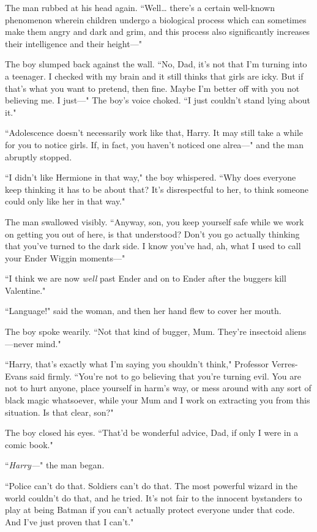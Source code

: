 The man rubbed at his head again. ``Well{\ldots} there's a certain well-known phenomenon wherein children undergo a biological process which can sometimes make them angry and dark and grim, and this process also significantly increases their intelligence and their height—"

The boy slumped back against the wall. ``No, Dad, it's not that I'm turning into a teenager. I checked with my brain and it still thinks that girls are icky. But if that's what you want to pretend, then fine. Maybe I'm better off with you not believing me. I just—" The boy's voice choked. ``I just couldn't stand lying about it."

``Adolescence doesn't necessarily work like that, Harry. It may still take a while for you to notice girls. If, in fact, you haven't noticed one alrea—" and the man abruptly stopped.

``I didn't like Hermione in that way," the boy whispered. ``Why does everyone keep thinking it has to be about that? It's disrespectful to her, to think someone could only like her in that way."

The man swallowed visibly. ``Anyway, son, you keep yourself safe while we work on getting you out of here, is that understood? Don't you go actually thinking that you've turned to the dark side. I know you've had, ah, what I used to call your Ender Wiggin moments—"

``I think we are now \emph{well} past Ender and on to Ender after the buggers kill Valentine."

``Language!" said the woman, and then her hand flew to cover her mouth.

The boy spoke wearily. ``Not that kind of bugger, Mum. They're insectoid aliens—never mind."

``Harry, that's exactly what I'm saying you shouldn't think," Professor Verres-Evans said firmly. ``You're not to go believing that you're turning evil. You are not to hurt anyone, place yourself in harm's way, or mess around with any sort of black magic whatsoever, while your Mum and I work on extracting you from this situation. Is that clear, son?"

The boy closed his eyes. ``That'd be wonderful advice, Dad, if only I were in a comic book."

``\emph{Harry—}" the man began.

``Police can't do that. Soldiers can't do that. The most powerful wizard in the world couldn't do that, and he tried. It's not fair to the innocent bystanders to play at being Batman if you can't actually protect everyone under that code. And I've just proven that I can't."

